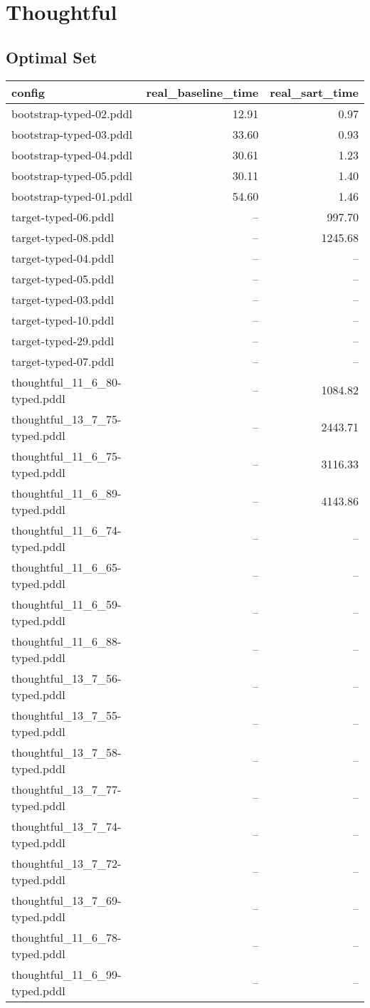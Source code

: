 \documentclass{article}
\begin{document}
                \newpage \section{Thoughtful}
                    \subsection*{Optimal Set}
                    
                            \begin{center}
                            \scriptsize
                            \begin{tabular}{@{}l|r|r@{}}
                            config & real\_baseline\_time & real\_sart\_time\\\midrule
                             bootstrap-typed-02.pddl&12.91&0.97\\
 bootstrap-typed-03.pddl&33.60&0.93\\
 bootstrap-typed-04.pddl&30.61&1.23\\
 bootstrap-typed-05.pddl&30.11&1.40\\
 bootstrap-typed-01.pddl&54.60&1.46\\
 target-typed-06.pddl&--&997.70\\
 target-typed-08.pddl&--&1245.68\\
 target-typed-04.pddl&--&--\\
 target-typed-05.pddl&--&--\\
 target-typed-03.pddl&--&--\\
 target-typed-10.pddl&--&--\\
 target-typed-29.pddl&--&--\\
 target-typed-07.pddl&--&--\\
 thoughtful\_11\_6\_80-typed.pddl&--&1084.82\\
 thoughtful\_13\_7\_75-typed.pddl&--&2443.71\\
 thoughtful\_11\_6\_75-typed.pddl&--&3116.33\\
 thoughtful\_11\_6\_89-typed.pddl&--&4143.86\\
 thoughtful\_11\_6\_74-typed.pddl&--&--\\
 thoughtful\_11\_6\_65-typed.pddl&--&--\\
 thoughtful\_11\_6\_59-typed.pddl&--&--\\
 thoughtful\_11\_6\_88-typed.pddl&--&--\\
 thoughtful\_13\_7\_56-typed.pddl&--&--\\
 thoughtful\_13\_7\_55-typed.pddl&--&--\\
 thoughtful\_13\_7\_58-typed.pddl&--&--\\
 thoughtful\_13\_7\_77-typed.pddl&--&--\\
 thoughtful\_13\_7\_74-typed.pddl&--&--\\
 thoughtful\_13\_7\_72-typed.pddl&--&--\\
 thoughtful\_13\_7\_69-typed.pddl&--&--\\
 thoughtful\_11\_6\_78-typed.pddl&--&--\\
 thoughtful\_11\_6\_99-typed.pddl&--&--
                            \end{tabular}
                            \end{center}
\end{document}
